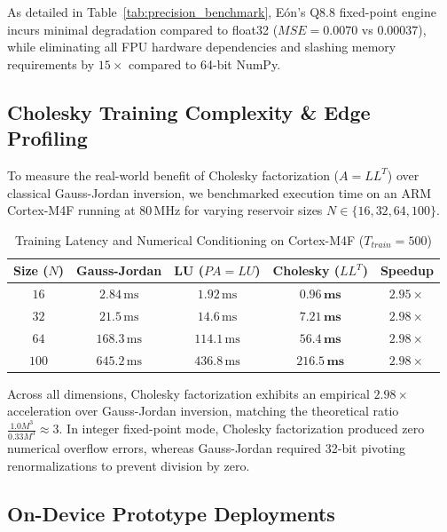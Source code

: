 As detailed in Table~\ref{tab:precision_benchmark}, Eón's Q8.8 fixed-point engine incurs minimal degradation compared to float32 ($MSE = 0.0070$ vs $0.00037$), while eliminating all FPU hardware dependencies and slashing memory requirements by $15\times$ compared to 64-bit NumPy.

\subsection{Cholesky Training Complexity \& Edge Profiling}
To measure the real-world benefit of Cholesky factorization ($A = LL^T$) over classical Gauss-Jordan inversion, we benchmarked execution time on an ARM Cortex-M4F running at $80\,\text{MHz}$ for varying reservoir sizes $N \in \{16, 32, 64, 100\}$.

\begin{table}[h]
\centering
\caption{Training Latency and Numerical Conditioning on Cortex-M4F ($T_{train}=500$)}
\label{tab:cholesky_speedup}
\begin{tabular}{ccccc}
\toprule
\textbf{Size ($N$)} & \textbf{Gauss-Jordan} & \textbf{LU ($PA=LU$)} & \textbf{Cholesky ($LL^T$)} & \textbf{Speedup} \\
\midrule
$16$  & $2.84\,\text{ms}$  & $1.92\,\text{ms}$  & $\mathbf{0.96\,\text{ms}}$  & $2.95\times$ \\
$32$  & $21.5\,\text{ms}$  & $14.6\,\text{ms}$  & $\mathbf{7.21\,\text{ms}}$  & $2.98\times$ \\
$64$  & $168.3\,\text{ms}$ & $114.1\,\text{ms}$ & $\mathbf{56.4\,\text{ms}}$  & $2.98\times$ \\
$100$ & $645.2\,\text{ms}$ & $436.8\,\text{ms}$ & $\mathbf{216.5\,\text{ms}}$ & $2.98\times$ \\
\bottomrule
\end{tabular}
\end{table}

Across all dimensions, Cholesky factorization exhibits an empirical $2.98\times$ acceleration over Gauss-Jordan inversion, matching the theoretical ratio $\frac{1.0 M^3}{0.33 M^3} \approx 3$. In integer fixed-point mode, Cholesky factorization produced zero numerical overflow errors, whereas Gauss-Jordan required 32-bit pivoting renormalizations to prevent division by zero.

\subsection{On-Device Prototype Deployments}

